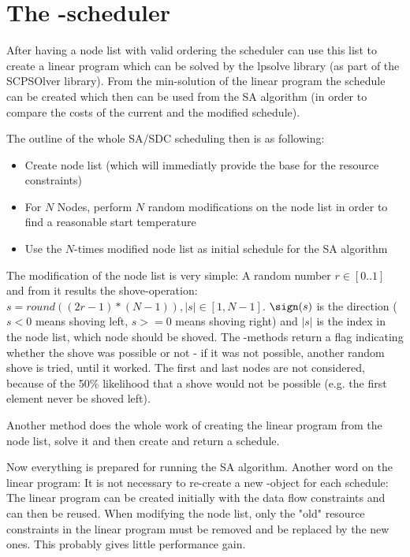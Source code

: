 \section{The -scheduler}
After having a node list with valid ordering the scheduler can use this list to create a linear program which can be solved by the lpsolve library (as part of the SCPSOlver library). From the min-solution of the linear program the schedule can be created which then can be used from the SA algorithm (in order to compare the costs of the current and the modified schedule).\par
The outline of the whole SA/SDC scheduling then is as following:
\begin{itemize}
	\item{Create node list (which will immediatly provide the base for the resource constraints)}
	\item{For $N$ Nodes, perform $N$ random modifications on the node list in order to find a reasonable start temperature}
	\item{Use the $N$-times modified node list as initial schedule for the SA algorithm}
\end{itemize}

The modification of the node list is very simple: A random number $r \in [0..1]$ and from it results the shove-operation: $s = round((2r-1)*(N-1)), |s| \in [1, N-1]$. $\sign(s)$ is the direction ($s<0$ means shoving left, $s>=0$ means shoving right) and $|s|$ is the index in the node list, which node should be shoved. The -methods return a flag indicating whether the shove was possible or not - if it was not possible, another random shove is tried, until it worked. The first and last nodes are not considered, because of the 50\% likelihood that a shove would not be possible (e.g. the first element never be shoved left).\par
Another method  does the whole work of creating the linear program from the node list, solve it and then create and return a schedule.\par
Now everything is prepared for running the SA algorithm. Another word on the linear program: It is not necessary to re-create a new -object for each schedule: The linear program can be created initially with the data flow constraints and can then be reused. When modifying the node list, only the "old" resource constraints in the linear program must be removed and be replaced by the new ones. This probably gives little performance gain.